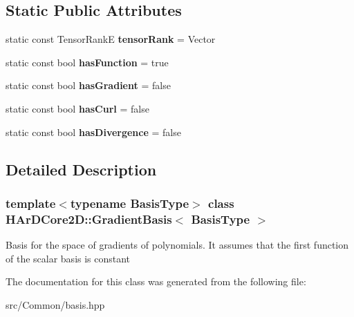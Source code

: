 \subsection*{Static Public Attributes}
\begin{DoxyCompactItemize}
\item 
\mbox{\label{classHArDCore2D_1_1GradientBasis_a1acbb7bb95bd4c88fb8d5bb283df1013}} 
static const Tensor\+RankE {\bfseries tensor\+Rank} = Vector
\item 
\mbox{\label{classHArDCore2D_1_1GradientBasis_a3db76edf9738f960e61862e962e6bd6f}} 
static const bool {\bfseries has\+Function} = true
\item 
\mbox{\label{classHArDCore2D_1_1GradientBasis_aa8f1cede00f4c25346edd02b828a7aa4}} 
static const bool {\bfseries has\+Gradient} = false
\item 
\mbox{\label{classHArDCore2D_1_1GradientBasis_a94d63d9b4462f078073749a5cf69f9dd}} 
static const bool {\bfseries has\+Curl} = false
\item 
\mbox{\label{classHArDCore2D_1_1GradientBasis_accec3fbf49f52c17ba38e873de7ac6ca}} 
static const bool {\bfseries has\+Divergence} = false
\end{DoxyCompactItemize}


\subsection{Detailed Description}
\subsubsection*{template$<$typename Basis\+Type$>$\newline
class H\+Ar\+D\+Core2\+D\+::\+Gradient\+Basis$<$ Basis\+Type $>$}

Basis for the space of gradients of polynomials. It assumes that the first function of the scalar basis is constant 

The documentation for this class was generated from the following file\+:\begin{DoxyCompactItemize}
\item 
src/\+Common/basis.\+hpp\end{DoxyCompactItemize}
